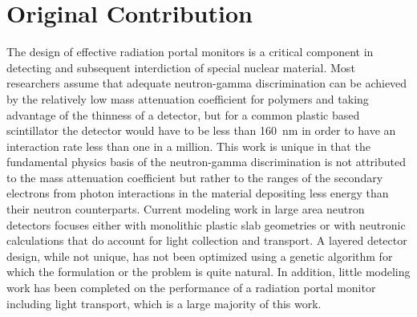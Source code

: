 \section{Original Contribution}
\label{sec:OrginalContribution}
The design of effective radiation portal monitors is a critical component in detecting and subsequent interdiction of special nuclear material.
Most researchers assume that adequate neutron-gamma discrimination can be achieved by the relatively low mass attenuation coefficient for polymers and taking advantage of the thinness of a detector, but for a common plastic based scintillator the detector would have to be less than \SI{160}{\nm} in order to have an interaction rate less than one in a million.
This work is unique in that the fundamental physics basis of the neutron-gamma discrimination is not attributed to the mass attenuation coefficient but rather to the ranges of the secondary electrons from photon interactions in the material depositing less energy than their neutron counterparts.
Current modeling work in large area neutron detectors focuses either with monolithic plastic slab geometries or with neutronic calculations that do account for light collection and transport.
A layered detector design, while not unique, has not been optimized using a genetic algorithm for which the formulation or the problem is quite natural.
In addition, little modeling work has been completed on the performance of a radiation portal monitor including light transport, which is a large majority of this work.
